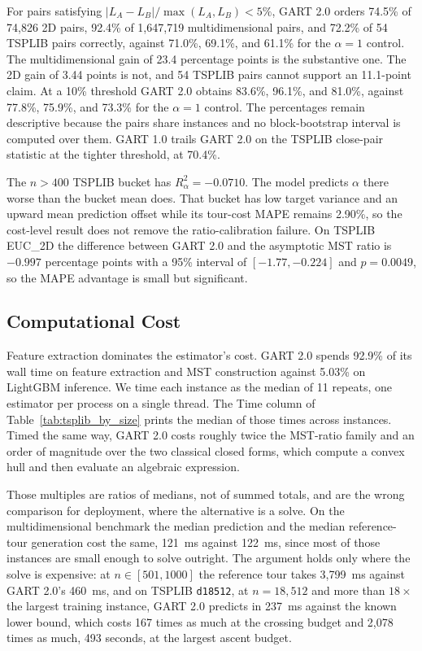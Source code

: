 \documentclass{article}
\begin{document}
For pairs satisfying $|L_A-L_B|/\max(L_A,L_B)<5\%$, GART 2.0 orders 74.5\% of 74{,}826 2D pairs, 92.4\% of 1{,}647{,}719 multidimensional pairs, and 72.2\% of 54 TSPLIB pairs correctly, against 71.0\%, 69.1\%, and 61.1\% for the $\alpha=1$ control. The multidimensional gain of 23.4 percentage points is the substantive one. The 2D gain of 3.44 points is not, and 54 TSPLIB pairs cannot support an 11.1-point claim. At a 10\% threshold GART 2.0 obtains 83.6\%, 96.1\%, and 81.0\%, against 77.8\%, 75.9\%, and 73.3\% for the $\alpha=1$ control. The percentages remain descriptive because the pairs share instances and no block-bootstrap interval is computed over them. GART 1.0 trails GART 2.0 on the TSPLIB close-pair statistic at the tighter threshold, at 70.4\%.

The $n>400$ TSPLIB bucket has $R^2_\alpha=-0.0710$. The model predicts $\alpha$ there worse than the bucket mean does. That bucket has low target variance and an upward mean prediction offset while its tour-cost MAPE remains 2.90\%, so the cost-level result does not remove the ratio-calibration failure. On TSPLIB EUC\_2D the difference between GART 2.0 and the asymptotic MST ratio is $-0.997$ percentage points with a 95\% interval of $[-1.77,-0.224]$ and $p=0.0049$, so the MAPE advantage is small but significant.

\subsection{Computational Cost} \label{subsec:cost_accounting}

Feature extraction dominates the estimator's cost. GART 2.0 spends 92.9\% of its wall time on feature extraction and MST construction against 5.03\% on LightGBM inference. We time each instance as the median of 11 repeats, one estimator per process on a single thread. The Time column of Table~\ref{tab:tsplib_by_size} prints the median of those times across instances. Timed the same way, GART 2.0 costs roughly twice the MST-ratio family and an order of magnitude over the two classical closed forms, which compute a convex hull and then evaluate an algebraic expression. 

Those multiples are ratios of medians, not of summed totals, and are the wrong comparison for deployment, where the alternative is a solve. On the multidimensional benchmark the median prediction and the median reference-tour generation cost the same, 121~ms against 122~ms, since most of those instances are small enough to solve outright. The argument holds only where the solve is expensive: at $n\in[501,1000]$ the reference tour takes 3{,}799~ms against GART 2.0's 460~ms, and on TSPLIB \texttt{d18512}, at $n=18{,}512$ and more than $18\times$ the largest training instance, GART 2.0 predicts in 237~ms against the known lower bound, which costs 167 times as much at the crossing budget and 2{,}078 times as much, 493 seconds, at the largest ascent budget. 
\end{document}
